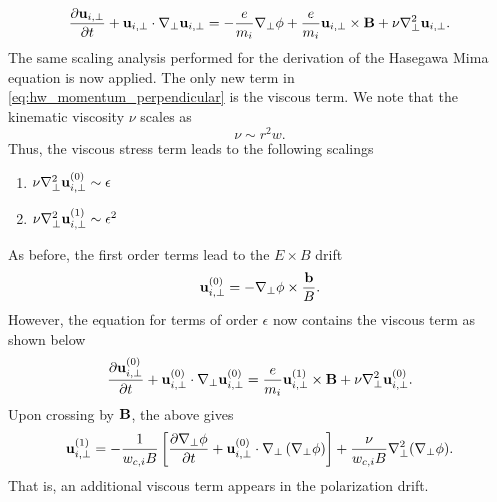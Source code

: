 \documentclass[11pt]{article}
\begin{document}
\begin{equation}
    \label{eq:hw_momentum_perpendicular}
        \frac{\partial \mathbf{u}_{i,\perp}}{\partial t} + \mathbf{u}_{i,\perp} \cdot \nabla_\perp \mathbf{u}_{i,\perp} = -\frac{e}{m_i} \nabla_\perp \phi + \frac{e}{m_i} \mathbf{u}_{i,\perp} \times \mathbf{B} + \nu \nabla_\perp^2 \mathbf{u}_{i,\perp}.
\end{equation}
The same scaling analysis performed for the derivation of the Hasegawa Mima equation is now applied. The only new term in \cref{eq:hw_momentum_perpendicular} is the viscous term. We note that the kinematic viscosity $\nu$ scales as
\begin{equation}
    \nu \sim r^2 w.
\end{equation}
Thus, the viscous stress term leads to the following scalings
\begin{enumerate}
    \item $\nu \nabla^2_\perp \mathbf{u}^{(0)}_{i,\perp} \sim \epsilon$
    \item $\nu \nabla^2_\perp \mathbf{u}^{(1)}_{i,\perp} \sim \epsilon^2$
\end{enumerate}
As before, the first order terms lead to the $E \times B$ drift
\begin{equation}
    \label{eq:hw_e_cross_b_drift}
    \mathbf{u}^{(0)}_{i,\perp} = -\nabla_\perp \phi \times \frac{\mathbf{b}}{B}.
\end{equation}
However, the equation for terms of order $\epsilon$ now contains the viscous term as shown below
\begin{equation}
    \frac{\partial \mathbf{u}_{i,\perp}^{(0)}}{\partial t} + \mathbf{u}_{i,\perp}^{(0)} \cdot \nabla_\perp \mathbf{u}_{i,\perp}^{(0)} = \frac{e}{m_i} \mathbf{u}_{i,\perp}^{(1)} \times \mathbf{B} + \nu \nabla_\perp^2 \mathbf{u}^{(0)}_{i,\perp}.
\end{equation}
Upon crossing by $\mathbf{B}$, the above gives
\begin{equation}
\label{eq:hw_polarization_drift}
    \mathbf{u}_{i,\perp}^{(1)} = -\frac{1}{w_{c,i} B} \left [ \frac{\partial \nabla_\perp \phi}{\partial t} + \mathbf{u}_{i,\perp}^{(0)} \cdot \nabla_\perp \left ( \nabla_\perp \phi \right ) \right ] + \frac{\nu}{w_{c,i}B} \nabla^2_\perp (\nabla_\perp \phi).
\end{equation}
That is, an additional viscous term appears in the polarization drift.
\end{document}
